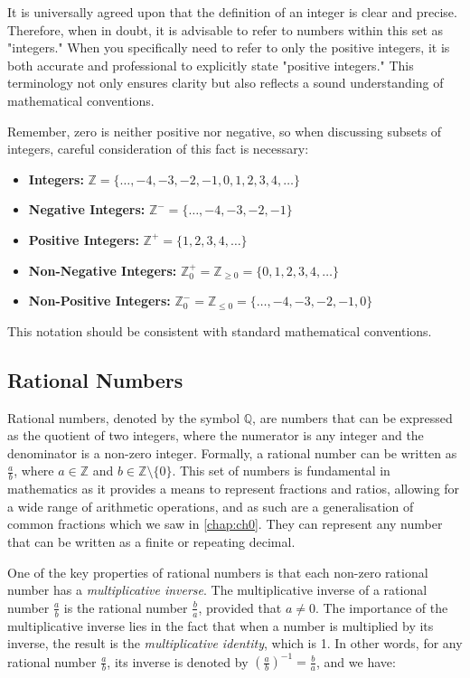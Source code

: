 It is universally agreed upon that the definition of an integer is clear and precise. Therefore, when in doubt, it is advisable to refer to numbers within this set as "integers." When you specifically need to refer to only the positive integers, it is both accurate and professional to explicitly state "positive integers." This terminology not only ensures clarity but also reflects a sound understanding of mathematical conventions. 

Remember, zero is neither positive nor negative, so when discussing subsets of integers, careful consideration of this fact is necessary:

\begin{itemize}
    \item \textbf{Integers:} $\mathbb{Z} = \{\ldots,-4,-3,-2,-1,0,1,2,3,4, \ldots\}$
    \item \textbf{Negative Integers:} $\mathbb{Z}^- = \{\ldots,-4,-3,-2,-1\}$
    \item \textbf{Positive Integers:} $\mathbb{Z}^+ = \{1,2,3,4, \ldots\}$
    \item \textbf{Non-Negative Integers:} $\mathbb{Z}_0^+ = \mathbb{Z}_{\geq 0} = \{0,1,2,3,4, \ldots\}$
    \item \textbf{Non-Positive Integers:} $\mathbb{Z}_0^- = \mathbb{Z}_{\leq 0} = \{\ldots,-4,-3,-2,-1, 0\}$
\end{itemize}

This notation should be consistent with standard mathematical conventions.

\subsection*{Rational Numbers}
Rational numbers, denoted by the symbol $\mathbb{Q}$, are numbers that can be expressed as the quotient of two integers, where the numerator is any integer and the denominator is a non-zero integer. Formally, a rational number can be written as $\frac{a}{b}$, where $a \in \mathbb{Z}$ and $b \in \mathbb{Z} \setminus \{0\}$. This set of numbers is fundamental in mathematics as it provides a means to represent fractions and ratios, allowing for a wide range of arithmetic operations, and as such are a generalisation of common fractions which we saw in \autoref{chap:ch0}. They can represent any number that can be written as a finite or repeating decimal.

One of the key properties of rational numbers is that each non-zero rational number has a \textit{multiplicative inverse}. The multiplicative inverse of a rational number $\frac{a}{b}$ is the rational number $\frac{b}{a}$, provided that $a \neq 0$. The importance of the multiplicative inverse lies in the fact that when a number is multiplied by its inverse, the result is the \textit{multiplicative identity}, which is 1. In other words, for any rational number $\frac{a}{b}$, its inverse is denoted by $\left(\frac{a}{b}\right)^{-1} = \frac{b}{a}$, and we have:

